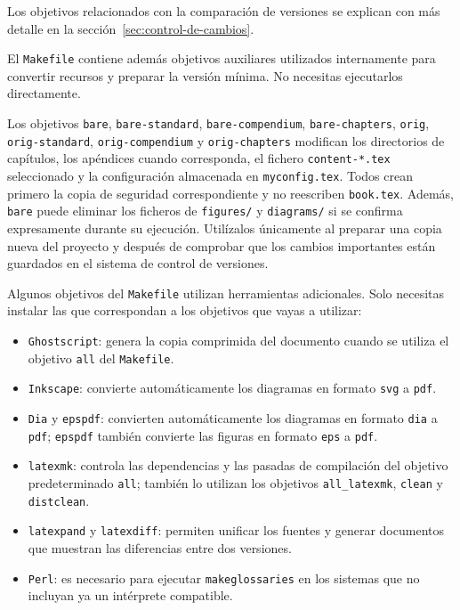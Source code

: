 Los objetivos relacionados con la comparación de versiones se explican con más detalle en la sección~\ref{sec:control-de-cambios}.

El \texttt{Makefile} contiene además objetivos auxiliares utilizados internamente para convertir recursos y preparar la versión mínima. No necesitas ejecutarlos directamente.

Los objetivos \texttt{bare}, \texttt{bare-standard}, \texttt{bare-compendium}, \texttt{bare-chapters}, \texttt{orig}, \texttt{orig-standard}, \texttt{orig-compendium} y \texttt{orig-chapters} modifican los directorios de capítulos, los apéndices cuando corresponda, el fichero \texttt{content-*.tex} seleccionado y la configuración almacenada en \texttt{myconfig.tex}. Todos crean primero la copia de seguridad correspondiente y no reescriben \texttt{book.tex}. Además, \texttt{bare} puede eliminar los ficheros de \texttt{figures/} y \texttt{diagrams/} si se confirma expresamente durante su ejecución. Utilízalos únicamente al preparar una copia nueva del proyecto y después de comprobar que los cambios importantes están guardados en el sistema de control de versiones.

Algunos objetivos del \texttt{Makefile} utilizan herramientas adicionales. Solo necesitas instalar las que correspondan a los objetivos que vayas a utilizar:

\begin{itemize}
  \item \texttt{Ghostscript}: genera la copia comprimida del documento cuando se utiliza el objetivo \texttt{all} del \texttt{Makefile}.
  \item \texttt{Inkscape}: convierte automáticamente los diagramas en formato \texttt{svg} a \texttt{pdf}.
  \item \texttt{Dia} y \texttt{epspdf}: convierten automáticamente los diagramas en formato \texttt{dia} a \texttt{pdf}; \texttt{epspdf} también convierte las figuras en formato \texttt{eps} a \texttt{pdf}.
  \item \texttt{latexmk}: controla las dependencias y las pasadas de compilación del objetivo predeterminado \texttt{all}; también lo utilizan los objetivos \texttt{all\_latexmk}, \texttt{clean} y \texttt{distclean}.
  \item \texttt{latexpand} y \texttt{latexdiff}: permiten unificar los fuentes y generar documentos que muestran las diferencias entre dos versiones.
  \item \texttt{Perl}: es necesario para ejecutar \texttt{makeglossaries} en los sistemas que no incluyan ya un intérprete compatible.
\end{itemize}

